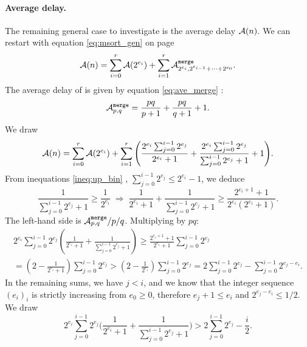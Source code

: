 \paragraph{Average delay.}

The remaining general case to investigate is the average delay
\(\Aideal(n)\). We can restart with equation \eqref{eq:msort_gen} on
page \pageref{eq:msort_gen}
\begin{equation*}
\Aideal(n)
  = \sum_{i=0}^{r}{\Aideal(2^{e_i})}
    +
    \sum_{i=1}^{r}{\ave{merge}{2^{e_i},2^{e_{i-1}}+\dots+2^{e_0}}}.
\end{equation*}
The average delay of  is given by equation
\eqref{eq:ave_merge} :
\[
\ave{merge}{p,q} = \frac{pq}{p+1} + \frac{pq}{q+1} + 1.
\]
We draw
\begin{equation}
\Aideal(n)
  = \sum_{i=0}^{r}{\Aideal(2^{e_i})}
     + 
     \sum_{i=1}^{r}{\left(\frac{2^{e_i}\sum_{j=0}^{i-1}{2^{e_j}}}{2^{e_i}+1}
     +
     \frac{2^{e_i}\sum_{j=0}^{i-1}{2^{e_j}}}{\sum_{j=0}^{i-1}{2^{e_j}}
       + 1}
     + 1\right)}.\label{eq:Aideal}
\end{equation}
From inequations \eqref{ineq:up_bin} ,
\(\sum_{j=0}^{i-1}{2^{e_j}} \leqslant 2^{e_{i}} - 1\), we deduce
\begin{equation*}
\frac{1}{\sum_{j=0}^{i-1}{2^{e_j}} + 1} \geqslant \frac{1}{2^{e_{i}}}
\;\Longrightarrow\;
\frac{1}{2^{e_{i}}+1} + \frac{1}{\sum_{j=0}^{i-1}{2^{e_j}} + 1}
\geqslant
\frac{2^{e_i+1}+1}{2^{e_i}(2^{e_i}+1)}.
\end{equation*}
The left\hyp{}hand side is \(\ave{merge}{p,q}/p/q\). Multiplying by
\(pq\):
\begin{gather*}
2^{e_i}\sum_{j=0}^{i-1}2^{e_j}\left(\frac{1}{2^{e_{i}}+1} +
\frac{1}{\sum_{j=0}^{i-1}{2^{e_j}} + 1}\right) 
\geqslant \frac{2^{e_i+1}+1}{2^{e_{i}}+1}\sum_{j=0}^{i-1}{2^{e_j}}\\
= \left(2 - \frac{1}{2^{e_i}+1}\right)\sum_{j=0}^{i-1}{2^{e_j}}
> \left(2 - \frac{1}{2^{e_i}}\right)\sum_{j=0}^{i-1}{2^{e_j}}
= 2\sum_{j=0}^{i-1}{2^{e_j}} - \sum_{j=0}^{i-1}{2^{e_j-e_i}}.
\end{gather*}
In the remaining sums, we have \(j < i\), and we know that the integer
sequence \((e_i)_i\) is strictly increasing from \(e_0 \geqslant 0\),
therefore \(e_j + 1 \leqslant e_i\) and \(2^{e_j-e_i} \leqslant 1/2\).
We draw
\begin{equation*}
2^{e_i}\sum_{j=0}^{i-1}2^{e_j}\bigg(\frac{1}{2^{e_{i}}+1} +
\frac{1}{\sum_{j=0}^{i-1}{2^{e_j}} + 1}\bigg) 
> 2\sum_{j=0}^{i-1}{2^{e_j}} - \frac{i}{2}.
\end{equation*}
